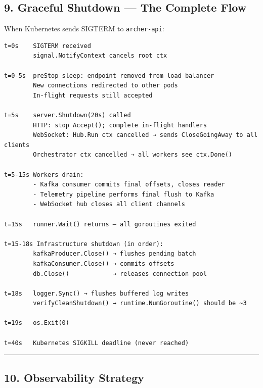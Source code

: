 \documentclass[
]{article}
\begin{document}
\hypertarget{graceful-shutdown-the-complete-flow}{%
\subsection{9. Graceful Shutdown --- The Complete
Flow}\label{graceful-shutdown-the-complete-flow}}

When Kubernetes sends SIGTERM to \texttt{archer-api}:

\begin{verbatim}
t=0s    SIGTERM received
        signal.NotifyContext cancels root ctx

t=0-5s  preStop sleep: endpoint removed from load balancer
        New connections redirected to other pods
        In-flight requests still accepted

t=5s    server.Shutdown(20s) called
        HTTP: stop Accept(); complete in-flight handlers
        WebSocket: Hub.Run ctx cancelled → sends CloseGoingAway to all clients
        Orchestrator ctx cancelled → all workers see ctx.Done()

t=5-15s Workers drain:
        - Kafka consumer commits final offsets, closes reader
        - Telemetry pipeline performs final flush to Kafka
        - WebSocket hub closes all client channels

t=15s   runner.Wait() returns — all goroutines exited

t=15-18s Infrastructure shutdown (in order):
        kafkaProducer.Close() → flushes pending batch
        kafkaConsumer.Close() → commits offsets
        db.Close()            → releases connection pool

t=18s   logger.Sync() → flushes buffered log writes
        verifyCleanShutdown() → runtime.NumGoroutine() should be ~3

t=19s   os.Exit(0)

t=40s   Kubernetes SIGKILL deadline (never reached)
\end{verbatim}

\begin{center}\rule{0.5\linewidth}{0.5pt}\end{center}

\hypertarget{observability-strategy}{%
\subsection{10. Observability Strategy}\label{observability-strategy}}
\end{document}

